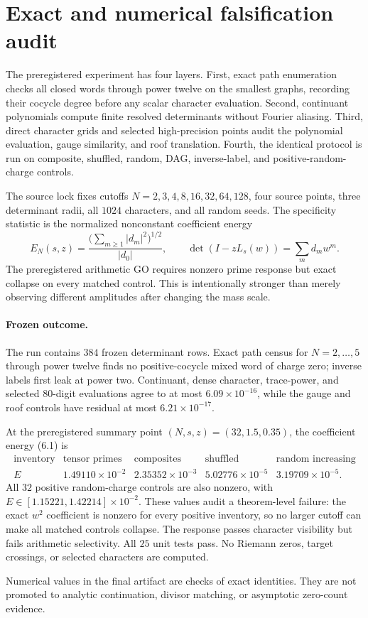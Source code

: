 \section{Exact and numerical falsification audit}

The preregistered experiment has four layers.  First, exact path enumeration
checks all closed words through power twelve on the smallest graphs, recording
their cocycle degree before any scalar character evaluation.  Second,
continuant polynomials compute finite resolved determinants without Fourier
aliasing.  Third, direct character grids and selected high-precision points
audit the polynomial evaluation, gauge similarity, and roof translation.
Fourth, the identical protocol is run on composite, shuffled, random, DAG,
inverse-label, and positive-random-charge controls.

The source lock fixes cutoffs $N=2,3,4,8,16,32,64,128$, four source points,
three determinant radii, all $1024$ characters, and all random seeds.  The
specificity statistic is the normalized nonconstant coefficient energy
\[
 E_N(s,z)=\frac{\bigl(\sum_{m\ge1}|d_m|^2\bigr)^{1/2}}
 {|d_0|},\qquad
 \det(I-zL_s(w))=\sum_m d_mw^m.                         \tag{6.1}
\]
The preregistered arithmetic GO requires nonzero prime response but exact
collapse on every matched control.  This is intentionally stronger than
merely observing different amplitudes after changing the mass scale.

\paragraph{Frozen outcome.}
The run contains $384$ frozen determinant rows.  Exact path census for
$N=2,\ldots,5$ through power twelve finds no positive-cocycle mixed word of
charge zero; inverse labels first leak at power two.  Continuant, dense
character, trace-power, and selected 80-digit evaluations agree to at most
$6.09\times10^{-16}$, while the gauge and roof controls have residual at most
$6.21\times10^{-17}$.

At the preregistered summary point $(N,s,z)=(32,1.5,0.35)$, the coefficient
energy (6.1) is
\[
\begin{array}{c|cccc}
\text{inventory}&\text{tensor primes}&\text{composites}&\text{shuffled}
 &\text{random increasing}\\ \hline
E&1.49110\times10^{-2}&2.35352\times10^{-3}&5.02776\times10^{-5}
 &3.19709\times10^{-5}.
\end{array}                                               \tag{6.2}
\]
All $32$ positive random-charge controls are also nonzero, with
$E\in[1.15221,1.42214]\times10^{-2}$.  These values audit a theorem-level
failure: the exact $w^2$ coefficient is nonzero for every positive inventory,
so no larger cutoff can make all matched controls collapse.  The response
passes character visibility but fails arithmetic selectivity.  All $25$
unit tests pass.  No Riemann zeros, target crossings, or selected characters
are computed.

Numerical values in the final artifact are checks of exact identities.  They
are not promoted to analytic continuation, divisor matching, or asymptotic
zero-count evidence.
